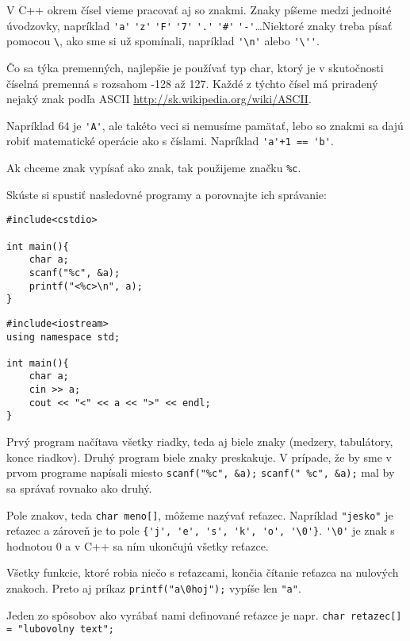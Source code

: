 
V C++ okrem čísel vieme pracovať aj so znakmi. Znaky píšeme medzi jednoité
úvodzovky, napríklad \verb!'a'! \verb!'z'! \verb!'F'! \verb!'7'! \verb!'.'!
\verb!'#'! \verb!'-'!\dots Niektoré znaky treba písať pomocou \verb'\', ako sme
si už spomínali, napríklad \verb!'\n'! alebo \verb!'\''!.

Čo sa týka premenných, najlepšie je používať typ char, ktorý je v skutočnosti
číselná premenná s rozsahom -128 až 127. Každé z týchto čísel má priradený
nejaký znak podľa ASCII \url{http://sk.wikipedia.org/wiki/ASCII}. 

Napríklad 64 je \verb!'A'!, ale takéto veci si nemusíme pamätať,
lebo so znakmi sa dajú robiť matematické operácie ako s číslami. 
Napríklad \verb!'a'+1 == 'b'!.

Ak chceme znak vypísať ako znak, tak použijeme značku \verb!%c!. 

\cvicenie Skúste si spustiť nasledovné programy a porovnajte ich správanie:

\begin{lstlisting}
#include<cstdio>

int main(){
    char a;
    scanf("%c", &a);
    printf("<%c>\n", a);
}
\end{lstlisting}
\begin{lstlisting}
#include<iostream>
using namespace std;

int main(){
    char a;
    cin >> a;
    cout << "<" << a << ">" << endl;
}
\end{lstlisting}

\riesenie Prvý program načítava všetky riadky, teda aj biele znaky
(medzery, tabulátory, konce riadkov). Druhý program biele znaky preskakuje.
V prípade, že by sme v prvom programe napísali miesto \verb!scanf("%c", &a);!
\verb!scanf(" %c", &a);! mal by sa správať rovnako ako druhý.

\medskip

Pole znakov, teda \verb!char meno[]!, môžeme nazývať reťazec. 
Napríklad \verb!"jesko"! je reťazec a zároveň je to pole
\verb!{'j', 'e', 's', 'k', 'o', '\0'}!. \verb!'\0'! je znak s hodnotou 0
a v C++ sa ním ukončujú všetky reťazce. 

Všetky funkcie, ktoré robia niečo s reťazcami, končia čítanie reťazca
na nulových znakoch. Preto aj príkaz \verb!printf("a\0hoj");! vypíše len \verb!"a"!. 

Jeden zo spôsobov ako vyrábať nami definované reťazce je napr.
\verb!char retazec[] = "lubovolny text";!

